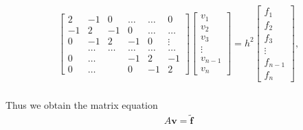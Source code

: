 \documentclass[12pt]{article}
\numberwithin{equation}{section}     %
\begin{document}
\begin{align*}
\begin{bmatrix}
2& -1& 0 &\dots   & \dots &0 \\
-1 & 2 & -1 &0 &\dots &\dots \\
0&-1 &2 & -1 & 0 & \vdots \\
 & \dots   & \dots &\dots   &\dots & \dots \\
 0&\dots   &  &-1 &2& -1 \\
0&\dots    &  & 0  &-1 & 2 \
\end{bmatrix}
\begin{bmatrix}
  v_{1}  \\
  v_{2}  \\
  v_{3}  \\
  \vdots \\
  v_{n-1} \\
  v_{n}
\end{bmatrix}
= h^{2} \begin{bmatrix}
  f_{1}  \\
  f_{2}  \\
  f_{3}  \\
  \vdots \\
  f_{n-1} \\
  f_{n}
\end{bmatrix},\\
\end{align*}

Thus we obtain the matrix equation
\begin{align*}
    A\bm{v}=\bm{\tilde{f}}
\end{align*}
\end{document}
